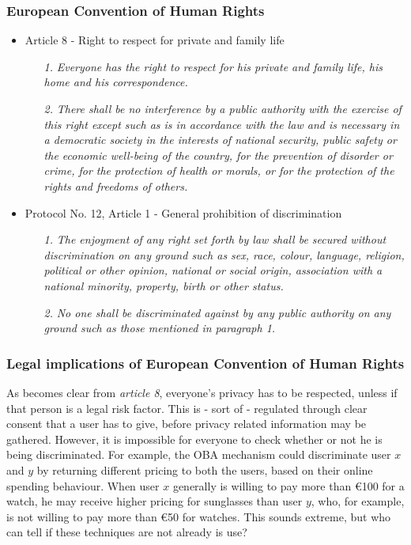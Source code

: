 \documentclass[11pt]{article}
\begin{document}
\subsubsection{European Convention of Human Rights}
\begin{itemize}
	\item Article 8 - Right to respect for private and family life
		\begin{itemize}
			\item [\textit{1.}] {\it Everyone has the right to respect for his private and family life, his home and his correspondence.}
			\item [\textit{2.}] {\it There shall be no interference by a public authority with the exercise of this right except such as is in accordance with the law and is necessary in a democratic society in the interests of national security, public safety or the economic well-being of the country, for the prevention of disorder or crime, for the protection of health or morals, or for the protection of the rights and freedoms of others.}
		\end{itemize}
	\item Protocol No. 12, Article 1 - General prohibition of discrimination 
		\begin{itemize}
			\item [\textit{1.}] {\it The enjoyment of any right set forth by law shall be secured without discrimination on any ground such as sex, race, colour, language, religion, political or other opinion, national or social origin, association with a national minority, property, birth or other status.}
			\item [\textit{2.}] {\it No one shall be discriminated against by any public authority on any ground such as those mentioned in paragraph 1.}
		\end{itemize}
\end{itemize}


\subsubsection{Legal implications of European Convention of Human Rights}
As becomes clear from \textit{article 8}, everyone's privacy has to be respected, unless if that person is a legal risk factor. This is - sort of - regulated through clear consent that a user has to give, before privacy related information may be gathered.
However, it is impossible for everyone to check whether or not he is being discriminated. For example, the OBA mechanism could discriminate user $x$ and $y$ by returning different pricing to both the users, based on their online spending behaviour. When user $x$ generally is willing to pay more than €100 for a watch, he may receive higher pricing for sunglasses than user $y$, who, for example, is not willing to pay more than €50 for watches. This sounds extreme, but who can tell if these techniques are not already is use?
\end{document}
